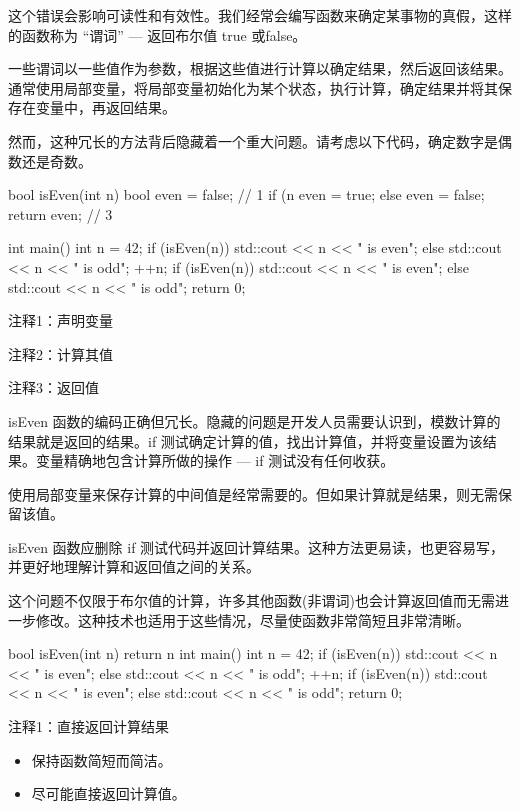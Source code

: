 这个错误会影响可读性和有效性。我们经常会编写函数来确定某事物的真假，这样的函数称为 “谓词” — 返回布尔值 true 或false。


一些谓词以一些值作为参数，根据这些值进行计算以确定结果，然后返回该结果。通常使用局部变量，将局部变量初始化为某个状态，执行计算，确定结果并将其保存在变量中，再返回结果。

然而，这种冗长的方法背后隐藏着一个重大问题。请考虑以下代码，确定数字是偶数还是奇数。


\begin{cpp}
bool isEven(int n) {
  bool even = false; // 1
  if (n %
    even = true;
  else
    even = false;
  return even; // 3
}

int main() {
  int n = 42;
  if (isEven(n))
    std::cout << n << " is even\n";
  else
    std::cout << n << " is odd\n";
  ++n;
  if (isEven(n))
    std::cout << n << " is even\n";
  else
    std::cout << n << " is odd\n";
  return 0;
}
\end{cpp}

{\footnotesize
注释1：声明变量

注释2：计算其值

注释3：返回值
}

isEven 函数的编码正确但冗长。隐藏的问题是开发人员需要认识到，模数计算的结果就是返回的结果。if 测试确定计算的值，找出计算值，并将变量设置为该结果。变量精确地包含计算所做的操作 — if 测试没有任何收获。


使用局部变量来保存计算的中间值是经常需要的。但如果计算就是结果，则无需保留该值。


isEven 函数应删除 if 测试代码并返回计算结果。这种方法更易读，也更容易写，并更好地理解计算和返回值之间的关系。

这个问题不仅限于布尔值的计算，许多其他函数(非谓词)也会计算返回值而无需进一步修改。这种技术也适用于这些情况，尽量使函数非常简短且非常清晰。


\begin{cpp}
bool isEven(int n) {
  return n %
}
int main() {
  int n = 42;
  if (isEven(n))
    std::cout << n << " is even\n";
  else
    std::cout << n << " is odd\n";
  ++n;
  if (isEven(n))
    std::cout << n << " is even\n";
  else
    std::cout << n << " is odd\n";
  return 0;
}
\end{cpp}

{\footnotesize
注释1：直接返回计算结果
}


\begin{itemize}
\item
保持函数简短而简洁。

\item
尽可能直接返回计算值。
\end{itemize}







